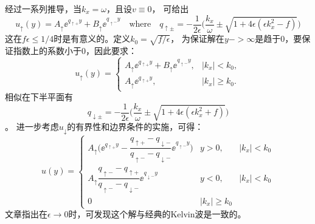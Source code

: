 \documentclass[UTF8,zihao=5]{ctexart} %
\begin{document}
经过一系列推导，当$k_x=\omega$，且设$v\equiv 0$，
可给出
\begin{equation}\label{eq:q_up}
    u_\uparrow(y) = A_\uparrow \ee^{q_{\uparrow+} y} + B_\uparrow \ee^{q_{\uparrow-} y}
    \quad
    \text{where}
    \quad
    q_{\uparrow\pm} = - \dfrac{1}{2\epsilon } \big(\dfrac{k_x}{\omega} \pm \sqrt{1+4\epsilon (\epsilon k_x^2-f)}\big)
\end{equation}
这在$f\epsilon\leq 1/4$时是有意义的。定义$k_0=\sqrt{f/\epsilon}$，
为保证解在$y->\infty$是趋于0，要保证指数上的系数小于0，因此要求：
\begin{equation}
    u_\uparrow(y) = \left\lbrace \begin{array}{ll}
        A_\uparrow \ee^{q_{\uparrow+} y} + B_\uparrow \ee^{q_{\uparrow-} y}, & |k_x| < k_0,    \\
        A_\uparrow \ee^{q_{\uparrow+} y},                                    & |k_x| \geq k_0.
    \end{array}\right.
\end{equation}
相似在下半平面有
\begin{equation}\label{eq:q_down}
    q_{\downarrow\pm} = - \dfrac{1}{2\epsilon } \big(\dfrac{k_x}{\omega} \pm \sqrt{1+4\epsilon (\epsilon k_x^2+f)}\big)
\end{equation}。
进一步考虑$u_\downarrow$的有界性和边界条件的实施，可得：
\begin{equation}\label{u_kelvin}
    u(y) = \left\lbrace \begin{array}{lll}
        A_\uparrow \Big(\ee^{q_{\uparrow+} y} -\dfrac{q_{\uparrow+}-q_{\downarrow-}}{q_{\uparrow-}-q_{\downarrow-}} \ee^{q_{\uparrow-} y} \Big) & y>0,          & |k_x|<k_0 \\
        A_\uparrow \dfrac{q_{\uparrow-}-q_{\uparrow+}}{q_{\uparrow-}-q_{\downarrow-}}\ee^{q_{\downarrow-} y}                                    & y<0,          & |k_x|<k_0 \\
        0                                                                                                                                       & |k_x|\geq k_0
    \end{array}\right.
\end{equation}
文章指出在$\epsilon\rightarrow 0$时，可发现这个解与经典的Kelvin波是一致的。
\end{document}
